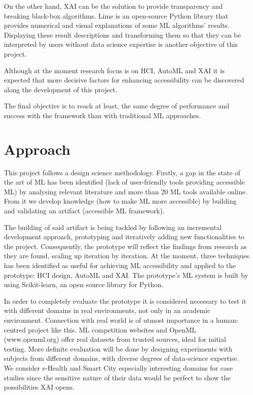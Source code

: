 \documentclass[runningheads]{llncs}
\begin{document}
On the other hand, XAI can be the solution to provide transparency and breaking black-box algorithms. Lime \cite{lime} is an open-source Python library that provides numerical and visual explanations of some ML algorithms' results. 
Displaying these result descriptions and transforming them so that they can be interpreted by users without data science expertise is another objective of this project.

Although at the moment research focus is on HCI, AutoML and XAI it is expected that more decisive factors for enhancing accessibility can be discovered along the development of this project. 

The final objective is to reach at least, the same degree of performance and success with the framework than with traditional ML approaches.

\section{Approach}

This project follows a design science methodology. Firstly, a gap in the state of the art of ML has been identified (lack of user-friendly tools providing accessible ML) by analysing relevant literature and more than 20 ML tools available online. From it we develop knowledge (how to make ML more accessible) by building and validating an artifact (accessible ML framework).

The building of said artifact is being tackled by following an incremental development approach, prototyping and iteratively adding new functionalities to the project. Consequently, the prototype will reflect the findings from research as they are found, scaling up iteration by iteration. At the moment, three techniques has been identified as useful for achieving ML accessibility and applied to the prototype: HCI design, AutoML and XAI. 
The prototype's ML system is built by using Scikit-learn, an open source library for Python.

In order to completely evaluate the prototype it is considered necessary to test it with different domains in real environments, not only in an academic environment. 
Connection with real world is of utmost importance in a human-centred project like this. ML competition websites and OpenML (www.openml.org) offer real datasets from trusted sources, ideal for initial testing. 
More definite evaluation will be done by designing experiments with subjects from different domains, with diverse degrees of data-science expertise. 
We consider e-Health and Smart City especially interesting domains for case studies since the sensitive nature of their data would be perfect to show the possibilities XAI opens.
\end{document}
